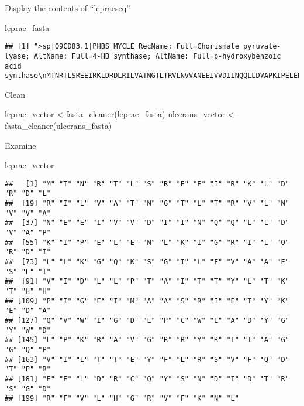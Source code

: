 \documentclass[
]{book}
\newenvironment{Shaded}{\begin{snugshade}}{\end{snugshade}}
\newcommand{\FunctionTok}[1]{\textcolor[rgb]{0.00,0.00,0.00}{#1}}
\newcommand{\NormalTok}[1]{#1}
\newcommand{\OtherTok}[1]{\textcolor[rgb]{0.56,0.35,0.01}{#1}}
\begin{document}
Display the contents of ``lepraeseq''

\begin{Shaded}
\begin{Highlighting}[]
\NormalTok{leprae\_fasta}
\end{Highlighting}
\end{Shaded}

\begin{verbatim}
## [1] ">sp|Q9CD83.1|PHBS_MYCLE RecName: Full=Chorismate pyruvate-lyase; AltName: Full=4-HB synthase; AltName: Full=p-hydroxybenzoic acid synthase\nMTNRTLSREEIRKLDRDLRILVATNGTLTRVLNVVANEEIVVDIINQQLLDVAPKIPELENLKIGRILQR\nDILLKGQKSGILFVAAESLIVIDLLPTAITTYLTKTHHPIGEIMAASRIETYKEDAQVWIGDLPCWLADY\nGYWDLPKRAVGRRYRIIAGGQPVIITTEYFLRSVFQDTPREELDRCQYSNDIDTRSGDRFVLHGRVFKNL\n\n"
\end{verbatim}

Clean

\begin{Shaded}
\begin{Highlighting}[]
\NormalTok{leprae\_vector }\OtherTok{\textless{}{-}}\FunctionTok{fasta\_cleaner}\NormalTok{(leprae\_fasta)}
\NormalTok{ulcerans\_vector }\OtherTok{\textless{}{-}}\FunctionTok{fasta\_cleaner}\NormalTok{(ulcerans\_fasta)}
\end{Highlighting}
\end{Shaded}

Examine

\begin{Shaded}
\begin{Highlighting}[]
\NormalTok{leprae\_vector}
\end{Highlighting}
\end{Shaded}

\begin{verbatim}
##   [1] "M" "T" "N" "R" "T" "L" "S" "R" "E" "E" "I" "R" "K" "L" "D" "R" "D" "L"
##  [19] "R" "I" "L" "V" "A" "T" "N" "G" "T" "L" "T" "R" "V" "L" "N" "V" "V" "A"
##  [37] "N" "E" "E" "I" "V" "V" "D" "I" "I" "N" "Q" "Q" "L" "L" "D" "V" "A" "P"
##  [55] "K" "I" "P" "E" "L" "E" "N" "L" "K" "I" "G" "R" "I" "L" "Q" "R" "D" "I"
##  [73] "L" "L" "K" "G" "Q" "K" "S" "G" "I" "L" "F" "V" "A" "A" "E" "S" "L" "I"
##  [91] "V" "I" "D" "L" "L" "P" "T" "A" "I" "T" "T" "Y" "L" "T" "K" "T" "H" "H"
## [109] "P" "I" "G" "E" "I" "M" "A" "A" "S" "R" "I" "E" "T" "Y" "K" "E" "D" "A"
## [127] "Q" "V" "W" "I" "G" "D" "L" "P" "C" "W" "L" "A" "D" "Y" "G" "Y" "W" "D"
## [145] "L" "P" "K" "R" "A" "V" "G" "R" "R" "Y" "R" "I" "I" "A" "G" "G" "Q" "P"
## [163] "V" "I" "I" "T" "T" "E" "Y" "F" "L" "R" "S" "V" "F" "Q" "D" "T" "P" "R"
## [181] "E" "E" "L" "D" "R" "C" "Q" "Y" "S" "N" "D" "I" "D" "T" "R" "S" "G" "D"
## [199] "R" "F" "V" "L" "H" "G" "R" "V" "F" "K" "N" "L"
\end{verbatim}
\end{document}
